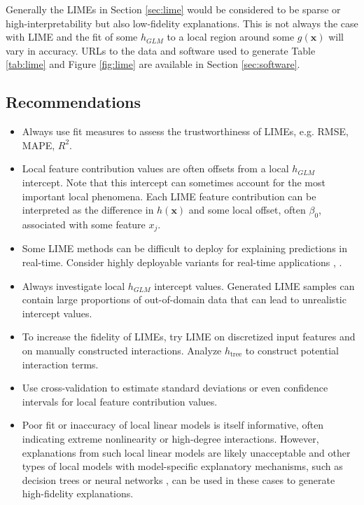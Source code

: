 \documentclass[sigconf, review]{acmart}
\begin{document}
Generally the LIMEs in Section \ref{sec:lime} would be considered to be sparse or high-interpretability but also low-fidelity explanations. This is not always the case with LIME and the fit of some $h_{GLM}$ to a local region around some $g(\mathbf{x})$ will vary in accuracy. URLs to the data and software used to generate Table \ref{tab:lime} and Figure \ref{fig:lime} are available in Section \ref{sec:software}.

\subsection{Recommendations}

\begin{itemize}
	
	\item Always use fit measures to assess the trustworthiness of LIMEs, e.g. RMSE, MAPE, $R^2$.

	\item Local feature contribution values are often offsets from a local $h_{GLM}$ intercept. Note that this intercept can sometimes account for the most important local phenomena. Each LIME feature contribution can be interpreted as the difference in $h(\mathbf{x})$ and some local offset, often $\beta_0$, associated with some  feature $x_j$.

	\item Some LIME methods can be difficult to deploy for explaining predictions in real-time. Consider highly deployable variants for real-time applications \cite{h2o_mli_booklet}, \cite{lime-sup}.
		
	\item Always investigate local $h_{GLM}$ intercept values. Generated LIME samples can contain large proportions of out-of-domain data that can lead to unrealistic intercept values. 
		
	\item To increase the fidelity of LIMEs, try LIME on discretized input features and on manually constructed interactions. Analyze $h_{\text{tree}}$ to construct potential interaction terms.
 	
	\item Use cross-validation to estimate standard deviations or even confidence intervals for local feature contribution values.
	
	\item Poor fit or inaccuracy of local linear models is itself informative, often indicating extreme nonlinearity or high-degree interactions. However, explanations from such local linear models are likely unacceptable and other types of local models with model-specific explanatory mechanisms, such as decision trees or neural networks \cite{wf_xnn}, can be used in these cases to generate high-fidelity explanations.
	
\end{itemize}
\end{document}
